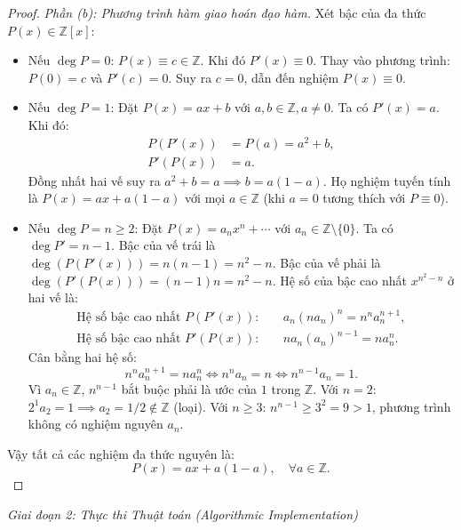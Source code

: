 \documentclass{article}
\begin{document}
\begin{proof}
\emph{Phần (b): Phương trình hàm giao hoán đạo hàm.}
Xét bậc của đa thức $P(x) \in \mathbb{Z}[x]$:
\begin{itemize}
    \item Nếu $\deg P = 0$: $P(x) \equiv c \in \mathbb{Z}$. Khi đó $P'(x) \equiv 0$.
    Thay vào phương trình: $P(0) = c$ và $P'(c) = 0$. Suy ra $c = 0$, dẫn đến nghiệm $P(x) \equiv 0$.
    \item Nếu $\deg P = 1$: Đặt $P(x) = ax + b$ với $a, b \in \mathbb{Z}, a \ne 0$.
    Ta có $P'(x) = a$. Khi đó:
    \begin{align}
        P(P'(x)) &= P(a) = a^2 + b, \\
        P'(P(x)) &= a.
    \end{align}
    Đồng nhất hai vế suy ra $a^2 + b = a \implies b = a(1 - a)$.
    Họ nghiệm tuyến tính là $P(x) = ax + a(1 - a)$ với mọi $a \in \mathbb{Z}$ (khi $a=0$ tương thích với $P \equiv 0$).
    \item Nếu $\deg P = n \ge 2$: Đặt $P(x) = a_n x^n + \cdots$ với $a_n \in \mathbb{Z} \setminus \{0\}$.
    Ta có $\deg P' = n - 1$.
    Bậc của vế trái là $\deg(P(P'(x))) = n(n - 1) = n^2 - n$.
    Bậc của vế phải là $\deg(P'(P(x))) = (n - 1)n = n^2 - n$.
    Hệ số của bậc cao nhất $x^{n^2 - n}$ ở hai vế là:
    \begin{align}
        \text{Hệ số bậc cao nhất } P(P'(x)): &\quad a_n (n a_n)^n = n^n a_n^{n+1}, \\
        \text{Hệ số bậc cao nhất } P'(P(x)): &\quad n a_n (a_n)^{n-1} = n a_n^n.
    \end{align}
    Cân bằng hai hệ số:
    \begin{equation}
        n^n a_n^{n+1} = n a_n^n \iff n^n a_n = n \iff n^{n-1} a_n = 1.
    \end{equation}
    Vì $a_n \in \mathbb{Z}$, $n^{n-1}$ bắt buộc phải là ước của $1$ trong $\mathbb{Z}$.
    Với $n = 2$: $2^1 a_2 = 1 \implies a_2 = 1/2 \notin \mathbb{Z}$ (loại).
    Với $n \ge 3$: $n^{n-1} \ge 3^2 = 9 > 1$, phương trình không có nghiệm nguyên $a_n$.
\end{itemize}
Vậy tất cả các nghiệm đa thức nguyên là:
\begin{equation}
    P(x) = ax + a(1 - a), \quad \forall a \in \mathbb{Z}.
\end{equation}
\end{proof}

\vspace{0.5em}\noindent\emph{Giai đoạn 2: Thực thi Thuật toán (Algorithmic Implementation)}

\end{document}
